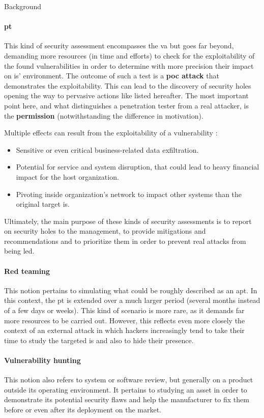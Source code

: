 \begin{chaptercover}{Background}
\paragraph{\acrfull{pt}} This kind of security assessment encompasses the \acrshort{va} but goes far beyond, demanding more resources (in time and efforts) to check for the exploitability of the found vulnerabilities in order to determine with more precision their impact on \acrshort{is}' environment. The outcome of such a test is a \textbf{\acrfull{poc} attack} that demonstrates the exploitability. This can lead to the discovery of security holes opening the way to pervasive actions like listed hereafter. The most important point here, and what distinguishes a penetration tester from a real attacker, is the \textbf{permission} (notwithstanding the difference in motivation).

Multiple effects can result from the exploitability of a vulnerability :
\begin{itemize}[itemsep=0.1cm,topsep=0.1cm]
  \item Sensitive or even critical business-related data exfiltration.
  \item Potential for service and system disruption, that could lead to heavy financial impact for the host organization.
  \item Pivoting inside organization's network to impact other systems than the original target \acrshort{is}.
\end{itemize}

Ultimately, the main purpose of these kinds of security assessments is to report on security holes to the management, to provide mitigations and recommendations and to prioritize them in order to prevent real attacks from being led.

\paragraph{Red teaming} This notion pertains to simulating what could be roughly described as an \acrfull{apt}. In this context, the \acrshort{pt} is extended over a much larger period (several months instead of a few days or weeks). This kind of scenario is more rare, as it demands far more resources to be carried out. However, this reflects even more closely the context of an external attack in which hackers increasingly tend to take their time to study the targeted \acrshort{is} and also to hide their presence.

\paragraph{Vulnerability hunting} This notion also refers to system or software review, but generally on a product outside its operating environment. It pertains to studying an asset in order to demonstrate its potential security flaws and help the manufacturer to fix them before or even after its deployment on the market.


\end{chaptercover}
